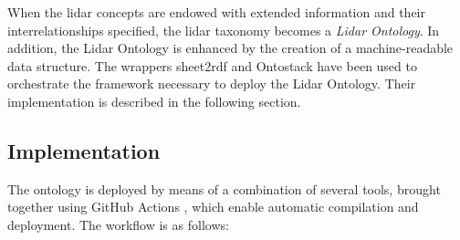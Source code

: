 \documentclass[remotesensing,article,submit,pdftex,moreauthors]{Definitions/mdpi}
\begin{document}
When the lidar concepts are endowed with extended information and their interrelationships specified, the lidar taxonomy becomes a {\it Lidar Ontology}.
In addition, the Lidar Ontology is enhanced by the creation of a machine-readable data structure.
The wrappers sheet2rdf \cite{ref-Fiorelli2015, nikola_vasiljevic_2021_4432136} and Ontostack \cite{ref-OntoStack} have been used to orchestrate the framework necessary to deploy the Lidar Ontology. Their implementation is described in the following section.

\subsection{Implementation}
\label{subsec:implementation}
The ontology is deployed by means of a combination of several tools, brought together using GitHub Actions \cite{ref-GitActions}, which enable automatic compilation and deployment. The workflow is as follows: 
\end{document}
